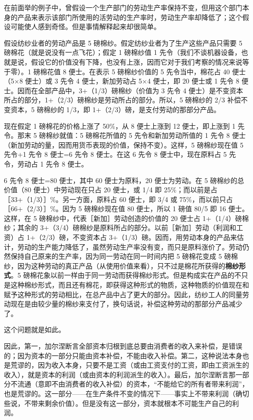 在前面举的例子中，曾假设一个生产部门的劳动生产率保持不变，但用这个部门本身的产品来表示该部门所使用的活劳动的生产率时，劳动生产率却降低了；这个假设可能使人感到奇怪。但是事情解释起来却很简单。

假设纺纱业者的劳动产品是 5 磅棉纱。假定纺纱业者为了生产这些产品只需要 5 磅棉花（就是说没有一点飞花）；假定 1 磅棉纱值 1 先令（我们不谈机器设备，也就是说，假设它的价值没有下降，也没有上涨，因而它对于我们考察的情况来说等于零）。1 磅棉花值 8 便士。在表示 5 磅棉纱价值的 5 先令当中，棉花占 40 便士（5×8 便士）或 3 先令 4 便士，新加劳动占 5×4 便士，即 20 便士或 1 先令 8 便士。因而在全部产品中，3+（1/3）磅棉纱（价值为 3 先令 4 便士）是不变资本所占的部分，1+（2/3）磅棉纱是劳动所占的部分。所以，5 磅棉纱的 2/3 补偿不变资本，5 磅棉纱的 1/3，即 1+（2/3）磅，是支付劳动的那部分产品。

现在假定 1 磅棉花的价格上涨了 50\%，从 8 便士上涨到 12 便士，即上涨到 1 先令。那末 5 磅棉纱就值：5 磅棉花所值的 5 先令和新加劳动所值的 1 先令 8 便士（新加劳动的量，因而用货币表现的价值，保持不变）。这样，5 磅棉纱现在值 5 先令+1 先令 8 便士=6 先令 8 便士。在这 6 先令 8 便士中，现在原料占 5 先令，劳动占 1 先令 8 便士。

6 先令 8 便士=80 便士，其中 60 便士为原料，20 便士为劳动。在 5 磅棉纱的总价值（80 便士）中劳动现在只占 20 便士，或 1/4 即 25\%；而以前是占［33+（1/3）］\%。另一方面，原料占 60 便士，即 3/4 或 75\%，而以前只占［66+（2/3）］\%。因为 5 磅棉纱现在值 80 便士，所以 1 磅值 80/5 即 16 便士。这样，在 5 磅棉纱中，代表［新加］劳动创造的价值的 20 便士占 1+（1/4）磅棉纱；其余的 3+（3/4）磅棉纱是原料所占的部分。以前［新加］劳动（利润和工资）占 1+（2/3）磅，不变资本占 3+（1/3）磅。因而，用劳动本身的产品来估计，劳动的生产能力降低了，虽然劳动生产率没有变，而只是原料涨价了。劳动仍然保持自己原来的生产率，因为同一劳动在同一时间内把 5 磅棉花变成 5 磅棉纱，因为这种劳动的真正产品（从使用价值来看），只不过是棉花所获得的\textbf{棉纱形式}。5 磅棉花象以前一样由于同一劳动而获得棉纱形式。但是构成实在产品的不只是这种棉纱形式，而且还有棉花，即获得这种形式的物质，这种物质的价值现在和赋予这种形式的劳动相比，在总产品中占了更大的部分。因此，纺纱工人的同量劳动现在是由较少量的棉纱来支付了，换句话说，补偿这种劳动的那部分产品减少了。

这个问题就是如此。


因此，第一，加尔涅断言全部资本归根到底总要由消费者的收入来补偿，是错误的；因为资本的一部分只能由资本补偿，不能由收入补偿。第二，这种说法本身也是荒谬的，因为收入本身，只要不是工资（或由工资支付的工资，即由工资派生的收入），就是资本的利润（或由资本的利润派生的收入）。最后，加尔涅断言那一部分不流通（意即不由消费者的收入补偿）的资本，“不能给它的所有者带来利润”，也是荒谬的。这一部分——在生产条件不变的情况下——事实上不带来利润（确切些说，不带来剩余价值）。但是没有这一部分，资本就根本不可能生产自己的利润。


